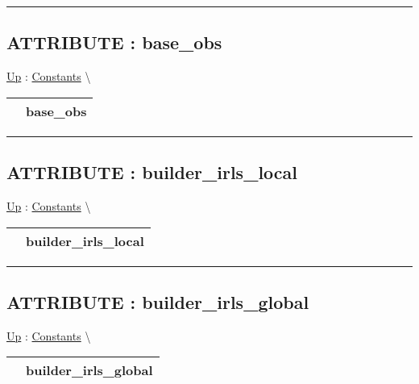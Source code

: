 \par


\rule{\linewidth}{0.5pt}
\subsection*{ATTRIBUTE : base\_obs}
\hypertarget{ecldoc:logisticregression.constants.base_obs}{}
\hyperlink{ecldoc:LogisticRegression.Constants}{Up} :
\hspace{0pt} \hyperlink{ecldoc:LogisticRegression.Constants}{Constants} \textbackslash 

{\renewcommand{\arraystretch}{1.5}
\begin{tabularx}{\textwidth}{|>{\raggedright\arraybackslash}l|X|}
\hline
\hspace{0pt} & base\_obs \\
\hline
\end{tabularx}
}

\par


\rule{\linewidth}{0.5pt}
\subsection*{ATTRIBUTE : builder\_irls\_local}
\hypertarget{ecldoc:logisticregression.constants.builder_irls_local}{}
\hyperlink{ecldoc:LogisticRegression.Constants}{Up} :
\hspace{0pt} \hyperlink{ecldoc:LogisticRegression.Constants}{Constants} \textbackslash 

{\renewcommand{\arraystretch}{1.5}
\begin{tabularx}{\textwidth}{|>{\raggedright\arraybackslash}l|X|}
\hline
\hspace{0pt} & builder\_irls\_local \\
\hline
\end{tabularx}
}

\par


\rule{\linewidth}{0.5pt}
\subsection*{ATTRIBUTE : builder\_irls\_global}
\hypertarget{ecldoc:logisticregression.constants.builder_irls_global}{}
\hyperlink{ecldoc:LogisticRegression.Constants}{Up} :
\hspace{0pt} \hyperlink{ecldoc:LogisticRegression.Constants}{Constants} \textbackslash 

{\renewcommand{\arraystretch}{1.5}
\begin{tabularx}{\textwidth}{|>{\raggedright\arraybackslash}l|X|}
\hline
\hspace{0pt} & builder\_irls\_global \\
\hline
\end{tabularx}
}

